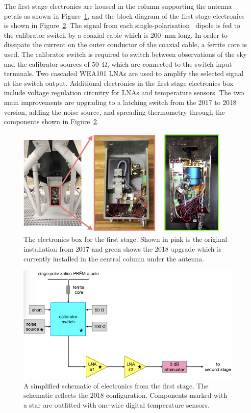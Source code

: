 The first stage electronics are housed in the column supporting the antenna petals as shown in Figure~\ref{Fig:column}, and the block diagram of the first stage electronics is shown in Figure~\ref{Fig:prizm_fee_block}. The signal from each single-polarisation \prizm\ dipole is fed to the calibrator switch by a coaxial cable which is \SI{200}{\milli \meter} long. In order to dissipate the current on the outer conductor of the coaxial cable, a ferrite core is used. The calibrator switch is required to switch between observations of the sky and the calibrator sources of \SI{50}{\ohm}, which are connected to the switch input terminals. Two cascaded WEA101 LNAs are used to amplify the selected signal at the switch output. Additional electronics in the first stage electronics box include voltage regulation circuitry for LNAs and temperature sensors. The two main improvements are upgrading to a latching switch from the 2017 to 2018 version, adding the noise source, and spreading thermometry through the components shown in Figure~\ref{Fig:prizm_fee_block}.

\begin{figure}
	\centering
	\includegraphics[width=0.7\linewidth]{Figures/column}
	\caption{The electronics box for the first stage. Shown in pink is the original installation from 2017 and green shows the 2018 upgrade which is currently installed in the central column under the antenna.}
	\label{Fig:column}
\end{figure}

\begin{figure}
	\centering
	\includegraphics[width=\linewidth]{Figures/prizm_fee_block}
	\caption{A simplified schematic of electronics from the first stage. The schematic reflects the 2018 configuration. Components marked with a star are outfitted with one-wire digital temperature sensors.}
	\label{Fig:prizm_fee_block}
\end{figure}  

